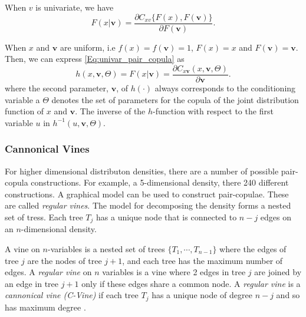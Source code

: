 \documentclass[12pt,oneside,a4paper]{book}
\theoremstyle{definition}
\theoremstyle{remark}
\begin{document}
				When $v$ is univariate, we have
				\begin{equation} \label{Eq:univar_pair_copula}
					F\left(x|\boldsymbol{v}\right) = \frac{\partial C_{xv} \{ F\left( x\right), F\left(\boldsymbol{v}\right) \}}{\partial F\left(\boldsymbol{v}\right)}.
				\end{equation}

				When $x$ and $\boldsymbol{v}$ are uniform, i.e $f\left(x\right) = f\left(\boldsymbol{v}\right) = 1$, $F\left(x\right) = x$ and $F\left(\boldsymbol{v} \right) = \boldsymbol{v}$. Then, we can express \ref{Eq:univar_pair_copula} as
				\begin{equation}
					h\left(x,\boldsymbol{v},\Theta\right) = F\left(x|\boldsymbol{v}\right) = \frac{\partial C_{x\boldsymbol{v}}\left(x,\boldsymbol{v},\Theta\right)}{\partial \boldsymbol{v}}.
				\end{equation} where the second parameter, $\boldsymbol{v}$, of $h\left( \cdotp \right)$  always corresponds to the conditioning variable a $\Theta$ denotes the set of parameters for the copula of the joint distribution function of $x$ and $\boldsymbol{v}$. The inverse of the $h$-function with respect to the first variable $u$ in $h^{-1} \left( u,\boldsymbol{v},\Theta \right)$\cite{aasPaircopulaConstructionsMultiple2009}.

				\subsubsection{Cannonical Vines}
				For higher dimensional distributon densities, there are a number of possible pair-copula constructions. For example, a 5-dimensional density, there 240 different constructions. A graphical model can be used to construct pair-copulae. These are called \textit{regular vines}\cite{bedfordVinesaNewGraphical2002}.
				The model for decomposing the density forms a nested set of tress. Each tree $T_j$ has a unique node that is connected to $n-j$ edges on an $n$-dimensional density.

				A vine on $n$-variables is a nested set of trees $\{T_1, \cdots, T_{n-1}\}$ where the edges of tree $j$ are the nodes of tree $j+1$, and each tree has the maximum number of edges. A \textit{regular vine} on $n$ variables is a vine where 2 edges in tree $j$ are joined by an edge in tree $j+1$ only if these edges share a common node.
				A \textit{regular vine} is a \textit{cannonical vine (C-Vine)} if each tree $T_j$ has a unique node of degree $n-j$ and so has maximum degree \cite{kurowickaDistributionfreeContinuousBayesian2004}.
\end{document}
